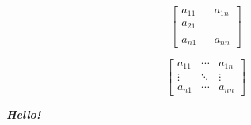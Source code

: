 \documentclass[12pt, a4paper]{article}
\begin{document}
    \begin{equation}
        \begin{bmatrix}
            a_{11} &  & a_{1n} \\
            a_{21} & & \\
            & & \\
            a_{n1} & & a_{nn}
        \end{bmatrix}
    \end{equation}
    
    \begin{equation}
        \begin{bmatrix}
            a_{11} & \cdots & a_{1n} \\
            \vdots & \ddots  & \vdots \\
            a_{n1} & \cdots & a_{nn}
        \end{bmatrix}
    \end{equation}

    \textbf{\textit{Hello!}}

            
            
        
                        
                        
            


    
\end{document}
